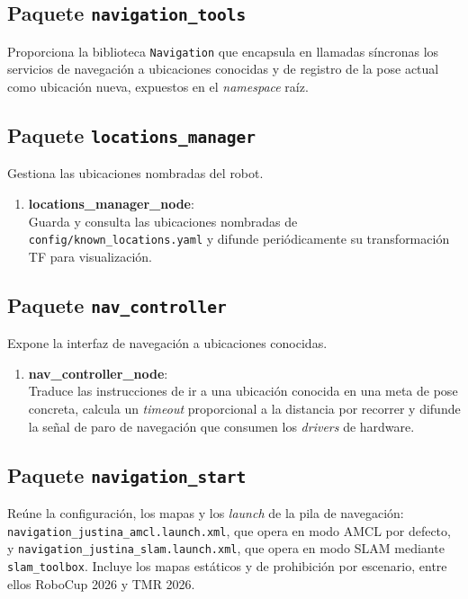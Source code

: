 \subsection{Paquete \texttt{navigation\_tools}}
Proporciona la biblioteca \texttt{Navigation} que encapsula en llamadas síncronas los servicios de navegación a ubicaciones conocidas y de registro de la pose actual como ubicación nueva, expuestos en el \textit{namespace} raíz.

\subsection{Paquete \texttt{locations\_manager}}
Gestiona las ubicaciones nombradas del robot.

\begin{enumerate}
    \item \textbf{locations\_manager\_node}: \\
    Guarda y consulta las ubicaciones nombradas de \texttt{config/known\_locations.yaml} y difunde periódicamente su transformación TF para visualización.
\end{enumerate}

\subsection{Paquete \texttt{nav\_controller}}
Expone la interfaz de navegación a ubicaciones conocidas.

\begin{enumerate}
    \item \textbf{nav\_controller\_node}: \\
    Traduce las instrucciones de ir a una ubicación conocida en una meta de pose concreta, calcula un \textit{timeout} proporcional a la distancia por recorrer y difunde la señal de paro de navegación que consumen los \textit{drivers} de hardware.
\end{enumerate}

\subsection{Paquete \texttt{navigation\_start}}
Reúne la configuración, los mapas y los \textit{launch} de la pila de navegación: \texttt{navigation\_justina\_amcl.launch.xml}, que opera en modo AMCL por defecto, y \texttt{navigation\_justina\_slam.launch.xml}, que opera en modo SLAM mediante \texttt{slam\_toolbox}. Incluye los mapas estáticos y de prohibición por escenario, entre ellos RoboCup 2026 y TMR 2026.

